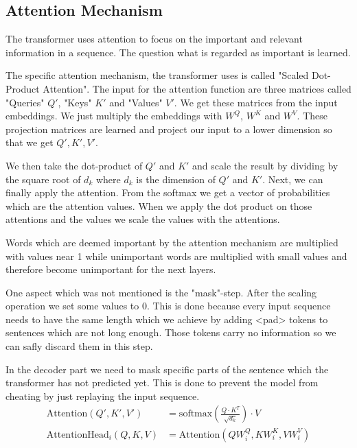 \subsection{Attention Mechanism}

The transformer uses attention to focus on the important and relevant information in a sequence. The question what is regarded as important is learned.

The specific attention mechanism, the transformer uses is called "Scaled Dot-Product Attention". The input for the attention function are three matrices called "Queries" $Q'$, "Keys" $K'$ and "Values" $V'$. We get these matrices from the input embeddings. We just multiply the embeddings with $W^Q$, $W^K$ and $W^V$. These projection matrices are learned and project our input to a lower dimension so that we get $Q', K', V'$.
\bigskip

We then take the dot-product of $Q'$ and $K'$ and scale the result by dividing by the square root of $d_k$ where $d_k$ is the dimension of $Q'$ and $K'$. Next, we can finally apply the attention. From the softmax we get a vector of probabilities which are the attention values. When we apply the dot product on those attentions and the values we scale the values with the attentions. 
\medskip

Words which are deemed important by the attention mechanism are multiplied with values near 1 while unimportant words are multiplied with small values and therefore become unimportant for the next layers.
\medskip

One aspect which was not mentioned is the "mask"-step. After the scaling operation we set some values to 0. This is done because every input sequence needs to have the same length which we achieve by adding <pad> tokens to sentences which are not long enough. Those tokens carry no information so we can safly discard them in this step. 

In the decoder part we need to mask specific parts of the sentence which the transformer has not predicted yet. This is done to prevent the model from cheating by just replaying the input sequence.
\begin{align}
	\text{Attention}(Q', K', V') & = \text{softmax}(\frac{Q \cdot K^T}{\sqrt{d_k}}) \cdot V \\
	\text{AttentionHead}_i(Q, K, V) & = \text{Attention}(QW_i^Q, KW_i^K, VW_i^V)
\end{align}


